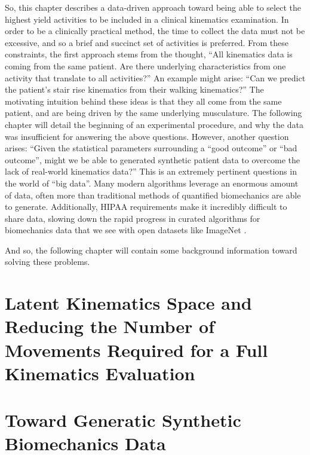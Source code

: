 So, this chapter describes a data-driven approach toward being able to select the highest yield activities to be included in a clinical kinematics examination.
In order to be a clinically practical method, the time to collect the data must not be excessive, and so a brief and succinct set of activities is preferred.
From these constraints, the first approach stems from the thought, ``All kinematics data is coming from the same patient. Are there underlying characteristics from one activity that translate to all activities?''
An example might arise: ``Can we predict the patient's stair rise kinematics from their walking kinematics?''
The motivating intuition behind these ideas is that they all come from the same patient, and are being driven by the same underlying musculature.
The following chapter will detail the beginning of an experimental procedure, and why the data was insufficient for answering the above questions.
However, another question arises: ``Given the statistical parameters surrounding a ``good outcome'' or ``bad outcome'', might we be able to generated synthetic patient data to overcome the lack of real-world kinematics data?''
This is an extremely pertinent questions in the world of ``big data''.
Many modern algorithms leverage an enormous amount of data, often more than traditional methods of quantified biomechanics are able to generate.
Additionally, HIPAA requirements make it incredibly difficult to share data, slowing down the rapid progress in curated algorithms for biomechanics data that we see with open datasets like ImageNet \cite{russakovskyImageNetLargeScale2015}.

And so, the following chapter will contain some background information toward solving these problems.

\section{Latent Kinematics Space and Reducing the Number of Movements Required for a Full Kinematics Evaluation}
\label{sec:latent-kinematics-space}



\section{Toward Generatic Synthetic Biomechanics Data}
\label{sec:synthetic-biomechanics-data}





